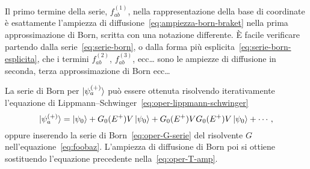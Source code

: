 \documentclass[a4paper,fleqn,twoside,12pt]{article}
\begin{document}
Il primo termine della serie, $f_{ab}^{(1)}$, nella rappresentazione della base
di coordinate è esattamente l'ampiezza di
diffusione~\eqref{eq:ampiezza-born-braket} nella prima approssimazione di Born,
scritta con una notazione differente.  È facile verificare partendo dalla
serie~\eqref{eq:serie-born}, o dalla forma più
esplicita~\eqref{eq:serie-born-esplicita}, che i termini $f_{ab}^{(2)}$,
$f_{ab}^{(3)}$, ecc\dots{}
sono le ampiezze di diffusione in seconda, terza approssimazione di Born
ecc\dots{}

La serie di Born per $\ket{\psi_{a}^{(+)}}$ può essere ottenuta risolvendo
iterativamente l'equazione di
Lippmann–Schwinger~\eqref{eq:oper-lippmann-schwinger}
\begin{equation}
  \ket{\psi_{a}^{(+)}} = \ket{\psi_{0}} + G_{0}(E^{+})V\ket{\psi_{0}} +
  G_{0}(E^{+})VG_{0}(E^{+})V\ket{\psi_{0}} + \cdots,
\end{equation}
oppure inserendo la serie di Born~\eqref{eq:oper-G-serie} del risolvente $G$
nell'equazione~\eqref{eq:foobaz}.  L'ampiezza di diffusione di Born poi si
ottiene sostituendo l'equazione precedente nella~\eqref{eq:oper-T-amp}.

{}
\printbibliography
\end{document}
